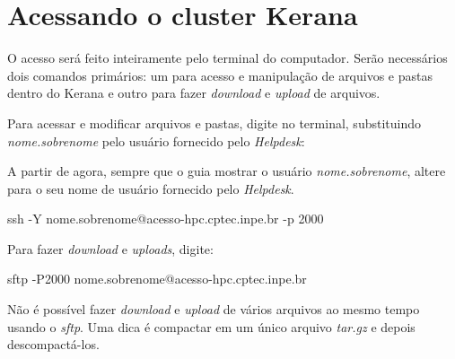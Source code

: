 \section{Acessando o cluster Kerana}\label{keranaacess}
\bigskip

\noindent O acesso será feito inteiramente pelo terminal do computador. Serão necessários dois comandos primários: um para acesso e manipulação de arquivos e pastas dentro do Kerana e outro para fazer \textit{download} e \textit{upload} de arquivos.
\bigskip

\noindent Para acessar e modificar arquivos e pastas, digite no terminal, substituindo \textit{nome.sobrenome} pelo usuário fornecido pelo \textit{Helpdesk}:
\bigskip

\begin{tcolorbox}[enhanced,
  grow to left by   = 0cm,
  grow to right by  = 0cm,
  enlarge top by    = 0cm,
  enlarge bottom by = 0cm,
  tcbox raise base,
  boxrule           = 1.0pt,
  left              = 18mm,
  colframe          = red!50!black,coltext=red!25!black,colback=red!10!white,
  overlay           = {\begin{tcbclipinterior}\fill[red!75!blue!50!white] (frame.south west)
    rectangle node[text=white,font=\sffamily\bfseries\footnotesize,rotate=0] {ATENÇÃO} ([xshift=18mm]frame.north west);\end{tcbclipinterior}}]
A partir de agora, sempre que o guia mostrar o usuário \textit{nome.sobrenome}, altere para o seu nome de usuário fornecido pelo \textit{Helpdesk}.
\end{tcolorbox}
\bigskip


\begin{bashcode}
ssh -Y nome.sobrenome@acesso-hpc.cptec.inpe.br -p 2000
\end{bashcode}
\bigskip

\noindent Para fazer \textit{download} e \textit{uploads}, digite:
\bigskip

\begin{bashcode}
sftp -P2000 nome.sobrenome@acesso-hpc.cptec.inpe.br
\end{bashcode}
\bigskip

\begin{tcolorbox}[enhanced,
  grow to left by   = 0cm,
  grow to right by  = 0cm,
  enlarge top by    = 0cm,
  enlarge bottom by = 0cm,
  tcbox raise base,
  boxrule           = 1.0pt,
  left              = 18mm,
  colframe          = red!50!black,coltext=red!25!black,colback=red!10!white,
  overlay           = {\begin{tcbclipinterior}\fill[red!75!blue!50!white] (frame.south west)
    rectangle node[text=white,font=\sffamily\bfseries\footnotesize,rotate=0] {ATENÇÃO} ([xshift=18mm]frame.north west);\end{tcbclipinterior}}]
Não é possível fazer \textit{download} e \textit{upload} de vários arquivos ao mesmo tempo usando o \textit{sftp}. Uma dica é compactar em um único arquivo \textit{tar.gz} e depois descompactá-los.
\end{tcolorbox}
\bigskip

